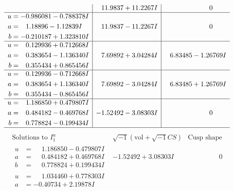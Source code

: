 \documentclass[1p]{elsarticle_modified}
\theoremstyle{definition}
\newcommand{\I}{\sqrt{-1}}
\begin{document}
$$\begin{array}{c|c|c}
 & \phantom{-}11.9837 + 11.2267 I & \phantom{-0.000000 } 0 \\ \hline\begin{aligned}
u &= -0.986081 - 0.788378 I \\
a &= \phantom{-}1.18896 - 1.12839 I \\
b &= -0.210187 + 1.323810 I\end{aligned}
 & \phantom{-}11.9837 - 11.2267 I & \phantom{-0.000000 } 0 \\ \hline\begin{aligned}
u &= \phantom{-}0.129936 + 0.712668 I \\
a &= \phantom{-}0.383654 - 1.136340 I \\
b &= \phantom{-}0.355434 + 0.865456 I\end{aligned}
 & \phantom{-}7.69892 + 3.04284 I & \phantom{-}6.83485 - 1.26769 I \\ \hline\begin{aligned}
u &= \phantom{-}0.129936 - 0.712668 I \\
a &= \phantom{-}0.383654 + 1.136340 I \\
b &= \phantom{-}0.355434 - 0.865456 I\end{aligned}
 & \phantom{-}7.69892 - 3.04284 I & \phantom{-}6.83485 + 1.26769 I \\ \hline\begin{aligned}
u &= \phantom{-}1.186850 + 0.479807 I \\
a &= \phantom{-}0.484182 - 0.469768 I \\
b &= \phantom{-}0.778824 - 0.199434 I\end{aligned}
 & -1.52492 - 3.08303 I & \phantom{-0.000000 } 0\\
 \hline 
 \end{array}$$\newpage$$\begin{array}{c|c|c}  
\text{Solutions to }I^u_{1}& \I (\text{vol} + \sqrt{-1}CS) & \text{Cusp shape}\\
 \hline 
\begin{aligned}
u &= \phantom{-}1.186850 - 0.479807 I \\
a &= \phantom{-}0.484182 + 0.469768 I \\
b &= \phantom{-}0.778824 + 0.199434 I\end{aligned}
 & -1.52492 + 3.08303 I & \phantom{-0.000000 } 0 \\ \hline\begin{aligned}
u &= \phantom{-}1.034460 + 0.778303 I \\
a &= -0.40734 + 2.19878 I \\

\end{aligned}
\end{array}$$
\end{document}
